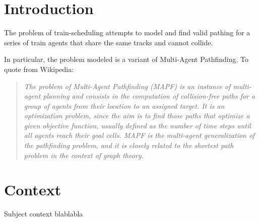 \section{Introduction}
The problem of train-scheduling attempts to model and find valid pathing for a series of train agents that share the same tracks and cannot collide. 

In particular, the problem modeled is a variant of Multi-Agent Pathfinding. To quote from Wikipedia:
\begin{quote}
\emph{The problem of Multi-Agent Pathfinding (MAPF) is an instance of multi-agent planning and consists in the computation of collision-free paths for a group of agents from their location to an assigned target. It is an optimization problem, since the aim is to find those paths that optimize a given objective function, usually defined as the number of time steps until all agents reach their goal cells. MAPF is the multi-agent generalization of the pathfinding problem, and it is closely related to the shortest path problem in the context of graph theory.}
\end{quote}


\section{Context}

Subject context blablabla
